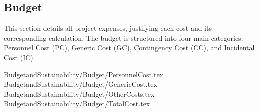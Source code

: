 \subsection{Budget}
\label{sec:budget}

This section details all project expenses, justifying each cost and its corresponding calculation. The budget is structured into four main categories: Personnel Cost (PC), Generic Cost (GC), Contingency Cost (CC), and Incidental Cost (IC).

 {BudgetandSustainability/Budget/PersonnelCost.tex}
 {BudgetandSustainability/Budget/GenericCost.tex}
 {BudgetandSustainability/Budget/OtherCosts.tex}
 {BudgetandSustainability/Budget/TotalCost.tex}
